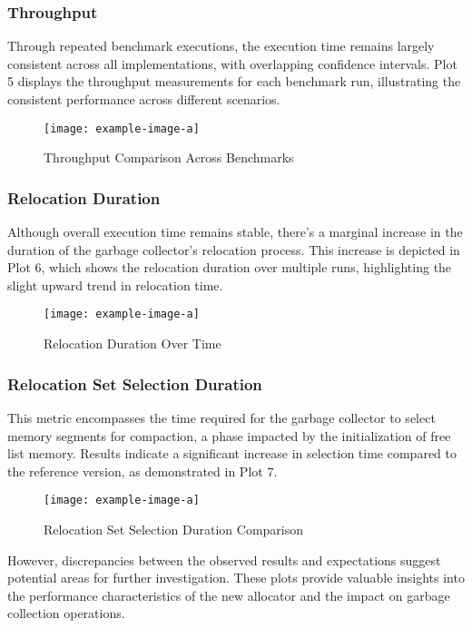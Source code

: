 \subsubsection{Throughput}

Through repeated benchmark executions, the execution time remains largely consistent across all implementations, with overlapping confidence intervals. Plot 5 displays the throughput measurements for each benchmark run, illustrating the consistent performance across different scenarios.

\begin{figure}[h]
\centering
\texttt{[image: example-image-a]}
\caption{Throughput Comparison Across Benchmarks}
\end{figure}

\subsubsection{Relocation Duration}

Although overall execution time remains stable, there's a marginal increase in the duration of the garbage collector's relocation process. This increase is depicted in Plot 6, which shows the relocation duration over multiple runs, highlighting the slight upward trend in relocation time.

\begin{figure}[h]
\centering
\texttt{[image: example-image-a]}
\caption{Relocation Duration Over Time}
\end{figure}

\subsubsection{Relocation Set Selection Duration}

This metric encompasses the time required for the garbage collector to select memory segments for compaction, a phase impacted by the initialization of free list memory. Results indicate a significant increase in selection time compared to the reference version, as demonstrated in Plot 7.

\begin{figure}[h]
\centering
\texttt{[image: example-image-a]}
\caption{Relocation Set Selection Duration Comparison}
\end{figure}

However, discrepancies between the observed results and expectations suggest potential areas for further investigation. These plots provide valuable insights into the performance characteristics of the new allocator and the impact on garbage collection operations.
